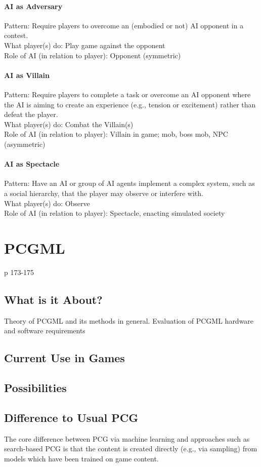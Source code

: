\documentclass[MGS,Master,english]{twbook}%
\begin{document}
\subsubsection{AI as Adversary}
Pattern: Require players to overcome an (embodied or not) AI opponent in a contest.\\
What player(s) do: Play game against the opponent\\
Role of AI (in relation to player): Opponent (symmetric)
\subsubsection{AI as Villain}
Pattern: Require players to complete a task or overcome an AI opponent where the AI is aiming to create an experience (e.g., tension or excitement) rather than defeat the player.\\
What player(s) do: Combat the Villain(s)\\
Role of AI (in relation to player): Villain in game; mob, boss mob, NPC (asymmetric)
\subsubsection{AI as Spectacle}
Pattern: Have an AI or group of AI agents implement a complex system, such as a social hierarchy, that the player may observe or interfere with.\\
What player(s) do: Observe\\
Role of AI (in relation to player): Spectacle, enacting simulated society


%
%
\clearpage
\chapter{\acl{PCGML}}
\cite{ai::book} p 173-175
\section{What is it About?}
Theory of PCGML and its methods in general.
Evaluation of PCGML hardware and software requirements
\section{Current Use in Games}
\section{Possibilities}
\section{Difference to Usual \acl{PCG}}
The core difference between PCG via machine learning and approaches such as search-based PCG is that the content is created directly (e.g., via sampling) from models which have been trained on game content. \cite{ai::book}
\end{document}
